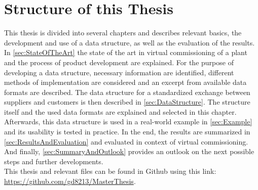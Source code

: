 \section{Structure of this Thesis}
    This thesis is divided into several chapters and describes relevant basics, the development and use of a data structure, as well as the evaluation of the results. \\
    In \autoref{sec:StateOfTheArt} the state of the art in virtual commissioning of a plant and the process of product development are explained. For the purpose of developing a data structure, necessary information are identified, different methods of implementation are considered and an excerpt from available data formats are described. 
    The data structure for a standardized exchange between suppliers and customers is then described in \autoref{sec:DataStructure}. The structure itself and the used data formats are explained and selected in this chapter. 
    Afterwards, this data structure is used in a real-world example in \autoref{sec:Example} and its usability is tested in practice. 
    In the end, the results are summarized in \autoref{sec:ResultsAndEvaluation} and evaluated in context of virtual commissioning. And finally, \autoref{sec:SummaryAndOutlook} provides an outlook on the next possible steps and further developments. \\
    
    This thesis and relevant files can be found in Github using this link: \url{https://github.com/gd8213/MasterThesis}.

	
